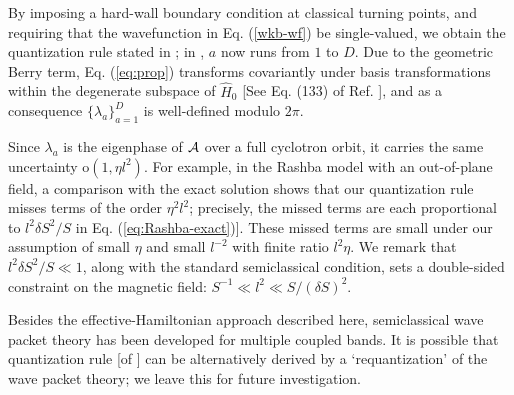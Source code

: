 \begin{appendices}
By imposing a hard-wall boundary condition at classical turning points, and requiring that the wavefunction in Eq. (\ref{wkb-wf}) be single-valued,\cite{100p} we obtain the quantization rule  stated in ; in , $a$ now runs from $1$ to $D$. Due to the geometric Berry term, Eq. ({\ref{eq:prop}}) transforms covariantly under basis transformations within the degenerate subspace of $\hat{H}_0$ [See Eq. (133) of Ref. ], and as a consequence $\{\lambda_a\}_{a=1}^D$ is well-defined modulo $2\pi$.

Since $\lambda_a$ is the eigenphase of ${\cal A}$ over a full cyclotron orbit, it carries the same uncertainty $\text{o}(1, \eta l^2)$. For example, in the Rashba model with an out-of-plane field, a comparison with the exact solution shows that our quantization rule misses terms of the order $\eta^2 l^2$; precisely, the missed terms are each proportional to  $l^2\delta S^2/S$ in Eq. (\ref{eq:Rashba-exact})]. These missed terms are small under our assumption of small $\eta$ and small $l^{-2}$ with finite ratio $l^2\eta$. We remark that $l^2\delta S^2/S\ll 1$, along with the standard semiclassical condition, sets a double-sided constraint on the magnetic field: $S^{-1} \ll l^2 \ll S/(\delta S)^2$. 


Besides the effective-Hamiltonian approach described here, semiclassical wave packet theory has been developed for multiple coupled bands\cite{culcer_coherent_2005}. It is possible that quantization rule [of ] can be alternatively derived by a `requantization' of the wave packet theory\cite{xiao_berry_2010}; we leave this for future investigation.  
\end{appendices}